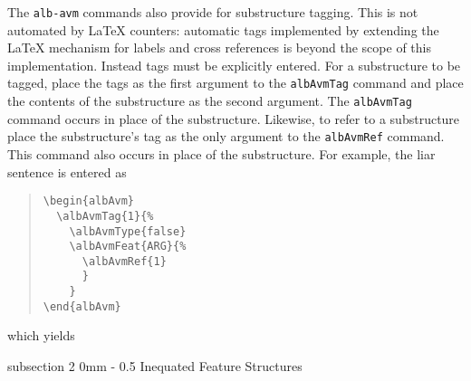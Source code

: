 \documentclass[11pt,a4paper,oneside]{article}
\makeatletter
\renewcommand{\subsection}{\@startsection%
  {subsection}%
  {2}%
  {0mm}%
  {-\baselineskip}%
  {0.5\baselineskip}%
  {\normalfont\sffamily\bfseries\large}%
  }
\makeatother
\begin{document}
The \texttt{alb-avm} commands also provide for substructure tagging.
This is not automated by \LaTeX{} counters: automatic tags implemented
by extending the \LaTeX{} mechanism for labels and cross references is
beyond the scope of this implementation.  Instead tags must be
explicitly entered.  For a substructure to be tagged, place the tags as
the first argument to the \texttt{albAvmTag} command and place the
contents of the substructure as the second argument.  The
\texttt{albAvmTag} command occurs in place of the substructure.
Likewise, to refer to a substructure place the substructure's tag as the
only argument to the \texttt{albAvmRef} command.  This command also
occurs in place of the substructure.  For example, the liar sentence is
entered as
\begin{quote}
\begin{verbatim}
\begin{albAvm}
  \albAvmTag{1}{%
    \albAvmType{false}
    \albAvmFeat{ARG}{%
      \albAvmRef{1}
      }
    }
\end{albAvm}
\end{verbatim}
\end{quote}
which yields
\begin{quote}
  \begin{albAvm}
  \end{albAvm}
\end{quote}


\subsection{Inequated Feature Structures}
\label{sec:avm-examples:ineq-feat-struct}
\end{document}
